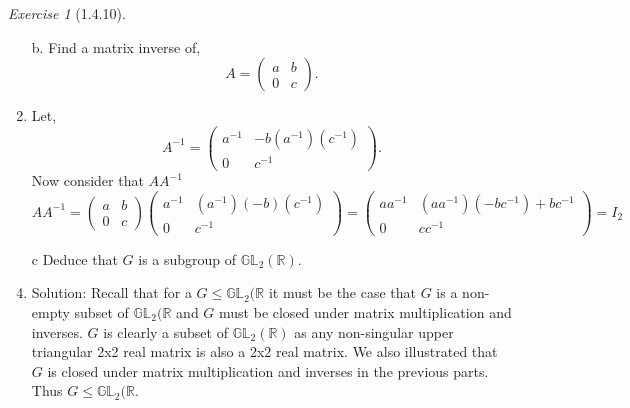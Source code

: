 \documentclass[12pt]{amsart}
\makeatletter
\theoremstyle{remark}
\newtheorem*{exercise}{Exercise}%
\renewenvironment{proof}[1][\proofname]{\par\doublespacing
  \pushQED{\qed}%
  \normalfont \topsep6\p@\@plus6\p@\relax
  \list{}{%
    \settowidth{\leftmargin}{\itshape\proofname:\hskip\labelsep}%
    \setlength{\labelwidth}{0pt}%
    \setlength{\itemindent}{-\leftmargin}%
  }%
  \item[\hskip\labelsep\itshape#1\@addpunct{:}]\ignorespaces
}{%
  \popQED\endlist\@endpefalse
  \singlespacing
}
\theoremstyle{mycomment}
\makeatother
\begin{document}
\begin{exercise}[1.4.10]
\begin{enumerate}
    \item[b.] Find a matrix inverse of, 
    \begin{equation*}
      A = \begin{pmatrix}
        a & b\\
        0 & c
      \end{pmatrix}.
    \end{equation*}
    \begin{proof} Let, 
      \begin{equation*}
        A^{-1} = 
        \begin{pmatrix}
          a^{-1} & -b(a^{-1})(c^{-1})\\
          0 & c^{-1}
        \end{pmatrix}.
      \end{equation*}
      Now consider that $AA^{-1}$
      \begin{equation*}
        AA^{-1} =
        \begin{pmatrix}
          a & b\\
          0 & c
        \end{pmatrix}
        \begin{pmatrix}
          a^{-1} & (a^{-1})(-b)(c^{-1})\\
          0 & c^{-1}
        \end{pmatrix} = 
        \begin{pmatrix}aa^{-1}&(aa^{-1})(-bc^{-1})+bc^{-1}\\ 0&cc^{-1}\end{pmatrix}
        = 
        I_2
      \end{equation*}
    \end{proof}
    
    
    \item[c] Deduce that $G$ is a subgroup of $\mathbb{G}\mathbb{L}_2(\mathbb{R})$.
    \begin{proof}{Solution:} Recall that for a $G \le \mathbb{G}\mathbb{L}_2(\mathbb{R}$ it must be the case that $G$ is a non-empty subset of 
      $\mathbb{G}\mathbb{L}_2(\mathbb{R}$ and $G$ must be closed under matrix multiplication and inverses. $G$ is clearly a subset of $\mathbb{G}\mathbb{L}_2(\mathbb{R})$ as 
      any non-singular upper triangular 2x2 real matrix is also a 2x2 real matrix. We also illustrated that $G$ is closed under matrix multiplication and inverses in the previous parts.
      Thus $G \le \mathbb{G}\mathbb{L}_2(\mathbb{R}$. 
    \end{proof}


\end{enumerate}
\end{exercise}
\end{document}
